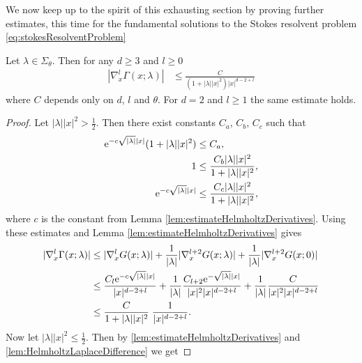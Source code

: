   We now keep up to the spirit of this exhausting section by proving further estimates, this time for the fundamental solutions to the Stokes resolvent problem \eqref{eq:stokesResolventProblem}

\begin{thm}
  \label{thm:fundamentalMatrixEstimate}
  Let $\lambda \in \Sigma_\theta$.
  Then for any $d \geq 3$ and $l \geq 0$
  \begin{align}
    \label{eq:fundamentalMatrixEstimate}
    | \nabla_x^l \Gamma(x; \lambda) | &\leq \frac{C}{(1 + |\lambda||x|^2) |x|^{d - 2 + l}} 
  \end{align}
    where $C$ depends only on $d$, $l$ and $\theta$. For $d = 2$ and $l \geq 1$ the same estimate holds.
\end{thm}

  \begin{proof}
    Let $|\lambda| |x|^2 > \frac{1}{2}$. 
    Then there exist constants $C_a$, $C_b$, $C_c$ such that
    \begin{align*}
      \mathrm{e}^{-c \sqrt{|\lambda|} |x|} ( 1 + |\lambda| |x|^2) &\leq C_a, \\
      1 &\leq \frac{C_b |\lambda| |x|^2}{1 + |\lambda| |x|^2}, \\
      \mathrm{e}^{-c \sqrt{|\lambda|} |x|} &\leq \frac{ C_c |\lambda| |x|^2}{1 + |\lambda| |x|^2},
    \end{align*}
    where $c$ is the constant from Lemma \ref{lem:estimateHelmholtzDerivatives}.
    Using these estimates and Lemma \ref{lem:estimateHelmholtzDerivatives} gives
    \begin{align*}
      |\nabla_x^l \Gamma(x; \lambda) |
      &\leq |\nabla_x^l G(x; \lambda)| + \frac{1}{|\lambda|} |\nabla_x^{l + 2} G(x; \lambda) | + \frac{1}{|\lambda|} |\nabla_x^{l + 2} G(x; 0)| \\
    &\leq\frac{C_l \mathrm{e}^{-c \sqrt{|\lambda|} |x|}}{|x|^{d - 2 + l}} + \frac{1}{|\lambda|} \frac{C_{l + 2} \mathrm{e}^{-\sqrt{|\lambda|} |x|}}{|x|^2 |x|^{d - 2 + l}} + \frac{1}{|\lambda|} \frac{C}{|x|^2 |x|^{d - 2 + l}} \\
    &\leq \frac{C}{1 + |\lambda| |x|^2}\; \frac{1}{|x|^{d - 2 + l}}.
    \end{align*}
    Now let $|\lambda| |x|^2 \leq \frac{1}{2}$.
    Then by \ref{lem:estimateHelmholtzDerivatives} and \ref{lem:HelmholtzLaplaceDifference} we get

\end{proof}
